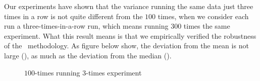 
Our experiments have shown that the variance running the same data just three times in a row is not quite different from the $100$ times, when we consider each run a three-times-in-a-row run, which means running $300$ times the same experiment. What this result means is that we empirically verified the robustness of the \CP\ methodology. As figure  below show, the deviation from the mean is not large (), as much as the deviation from the median ().

\begin{figure}
  \centering
  
  \begin{minipage}[t]{\linewidth}
  \end{minipage}
  \caption{$100$-times running $3$-times experiment}
  \label{fig:CProbust}
\end{figure}

